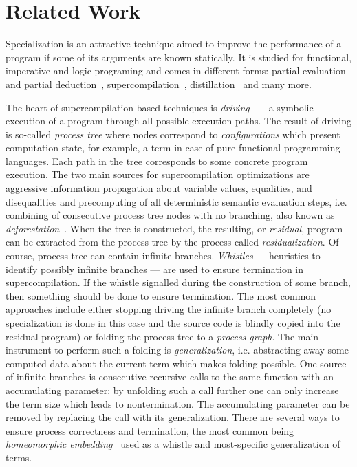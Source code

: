 \section{Related Work}

Specialization is an attractive technique aimed to improve the performance of a program if some of its arguments are known statically.
It is studied for functional, imperative and logic programing and comes in different forms: partial evaluation~\cite{jonesbook} and partial deduction~\cite{lloyd1991partial}, supercompilation~\cite{soerensen1996positive}, distillation~\cite{hamilton2007distillation} and many more.


The heart of supercompilation-based techniques is \emph{driving}~---~a symbolic execution of a program through all possible execution paths.
The result of driving is so-called \emph{process tree} where nodes correspond to \emph{configurations} which present computation state, for example, a term in case of pure functional programming languages.
Each path in the tree corresponds to some concrete program execution.
The two main sources for supercompilation optimizations are aggressive information propagation about variable values, equalities, and disequalities and precomputing of all deterministic semantic evaluation steps, i.e. combining of consecutive process tree nodes with no branching, also known as \emph{deforestation}~\cite{deforestation}.
When the tree is constructed, the resulting, or \emph{residual}, program can be extracted from the process tree by the process called \emph{residualization}.
Of course, process tree can contain infinite branches.
\emph{Whistles} --- heuristics to identify possibly infinite branches --- are used to ensure termination in supercompilation.
If the whistle signalled during the construction of some branch, then something should be done to ensure termination.
The most common approaches include either stopping driving the infinite branch completely (no specialization is done in this case and the source code is blindly copied into the residual program) or folding the process tree to a \emph{process graph}.
The main instrument to perform such a folding is \emph{generalization}, i.e. abstracting away some computed data about the current term which makes folding possible.
One source of infinite branches is consecutive recursive calls to the same function with an accumulating parameter: by unfolding such a call further one can only increase the term size which leads to nontermination.
The accumulating parameter can be removed by replacing the call with its generalization.
There are several ways to ensure process correctness and termination, the most common being \emph{homeomorphic embedding}~\cite{Higman52,Kruskal60} used as a whistle and most-specific generalization of terms.

